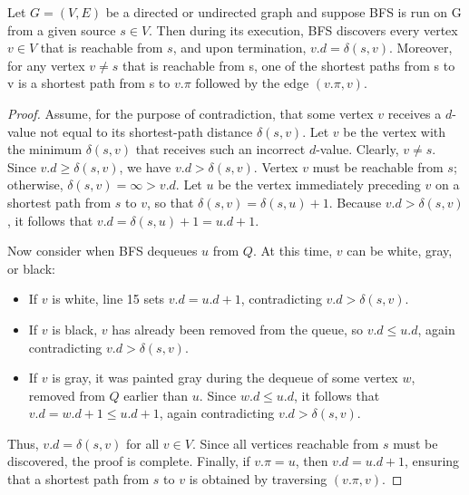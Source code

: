 \newtheorem{correctedness of bfs}{Lemma}
\begin{theorem}
    Let $G = (V, E)$ be a directed or undirected graph and suppose BFS is run on G 
    from a given source $s \in V$. Then during its execution, BFS discovers every vertex
    $v \in V$ that is reachable from $s$, and upon termination, $v.d = \delta(s, v)$.
    Moreover, for any vertex $v \neq s$ that is reachable from s, one of the shortest paths 
    from s to v is a shortest path from s to $v.\pi$ followed by the edge $(v.\pi, v)$.
\end{theorem}
\begin{proof}
    Assume, for the purpose of contradiction, that some vertex $v$ receives a $d$-value not equal to its shortest-path distance $\delta(s, v)$. Let $v$ be the vertex with the minimum $\delta(s, v)$ that receives such an incorrect $d$-value. Clearly, $v \neq s$. Since 
    $v.d \geq \delta(s, v)$, 
    we have 
    $v.d > \delta(s, v)$. 
    Vertex $v$ must be reachable from $s$; otherwise, 
    $\delta(s, v) = \infty > v.d$. 
    Let $u$ be the vertex immediately preceding $v$ on a shortest path from $s$ to $v$, so that 
    $\delta(s, v) = \delta(s, u) + 1$. 
    Because 
    $v.d > \delta(s, v)$, 
    it follows that 
    $v.d = \delta(s, u) + 1 = u.d + 1$. 

    Now consider when BFS dequeues $u$ from $Q$. At this time, $v$ can be white, gray, or black:
    \begin{itemize}
        \item If $v$ is white, line 15 sets 
        $v.d = u.d + 1$, 
        contradicting 
        $v.d > \delta(s, v)$.

        \item If $v$ is black, $v$ has already been removed from the queue, so 
        $v.d \leq u.d$, 
        again contradicting 
        $v.d > \delta(s, v)$.

        \item If $v$ is gray, it was painted gray during the dequeue of some vertex $w$, removed from $Q$ earlier than $u$. Since 
        $w.d \leq u.d$, 
        it follows that 
        $v.d = w.d + 1 \leq u.d + 1$, 
        again contradicting 
        $v.d > \delta(s, v)$.
    \end{itemize}

    Thus, 
    $v.d = \delta(s, v)$ 
    for all $v \in V$. Since all vertices reachable from $s$ must be discovered, the proof is complete. Finally, if 
    $v.\pi = u$, 
    then 
    $v.d = u.d + 1$, 
    ensuring that a shortest path from $s$ to $v$ is obtained by traversing 
    $(v.\pi, v)$.
\end{proof}

